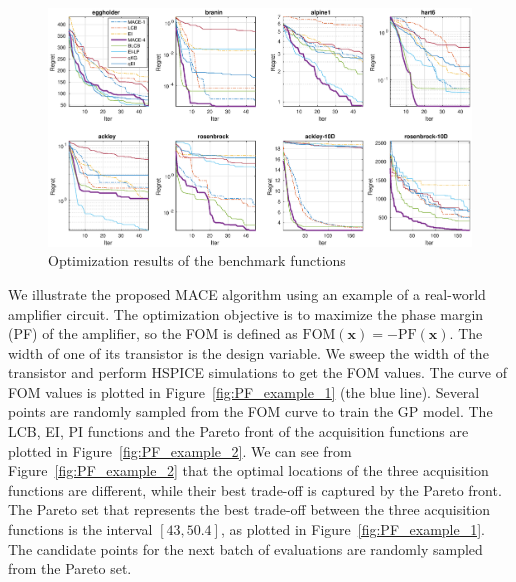 \begin{figure}[htbp]
    \begin{center}
        \centerline{\includegraphics[width=1.0\linewidth]{./img/convplot.eps}}
        \caption{Optimization results of the benchmark functions}
        \label{fig:CovPlotBenchmark}
    \end{center}
\end{figure}


We illustrate the proposed MACE algorithm using an example of a real-world amplifier circuit. The optimization objective is to maximize the phase margin (PF) of the amplifier, so the FOM is defined as $\mathrm{FOM}(\bm{x}) = - \mathrm{PF}(\bm{x})$. The width of one of its transistor is the design variable. We sweep the width of the transistor and perform HSPICE simulations to get the FOM values. The curve of FOM values is plotted in Figure~\ref{fig:PF_example_1} (the blue line). Several points are randomly sampled from the FOM curve to train the GP model. The LCB, EI, PI functions and the Pareto front of the acquisition functions are plotted in Figure~\ref{fig:PF_example_2}. We can see from Figure~\ref{fig:PF_example_2} that the optimal locations of the three acquisition functions are different, while their best trade-off is captured by the Pareto front. The Pareto set that represents the best trade-off between the three acquisition functions is the interval $[43, 50.4]$, as plotted in Figure~\ref{fig:PF_example_1}. The candidate points for the next batch of evaluations are randomly sampled from the Pareto set.


